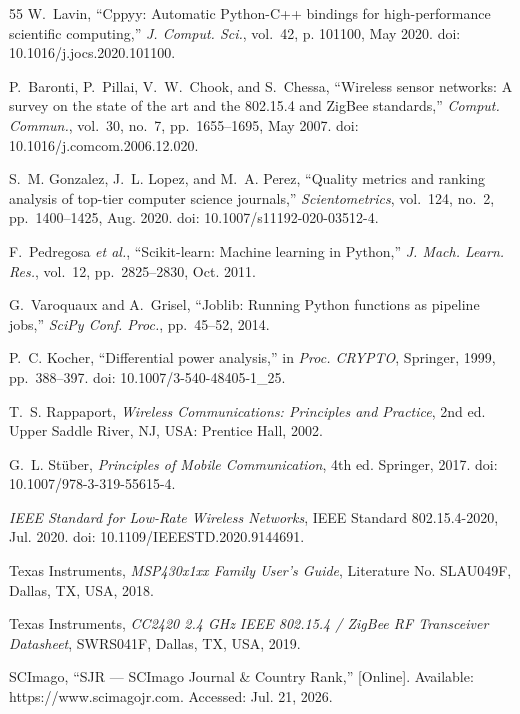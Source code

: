 \documentclass[journal]{IEEEtran}
\begin{document}
\begin{thebibliography}{55}
W.~Lavin, ``Cppyy: Automatic Python-C++ bindings for high-performance scientific computing,'' \textit{J. Comput. Sci.}, vol.~42, p. 101100, May 2020. doi: 10.1016/j.jocs.2020.101100.

P.~Baronti, P.~Pillai, V.~W.~Chook, and S.~Chessa, ``Wireless sensor networks: A survey on the state of the art and the 802.15.4 and ZigBee standards,'' \textit{Comput. Commun.}, vol.~30, no.~7, pp.~1655--1695, May 2007. doi: 10.1016/j.comcom.2006.12.020.

S.~M. Gonzalez, J.~L. Lopez, and M.~A. Perez, ``Quality metrics and ranking analysis of top-tier computer science journals,'' \textit{Scientometrics}, vol.~124, no.~2, pp.~1400--1425, Aug. 2020. doi: 10.1007/s11192-020-03512-4.

F.~Pedregosa \textit{et al.}, ``Scikit-learn: Machine learning in Python,'' \textit{J. Mach. Learn. Res.}, vol.~12, pp.~2825--2830, Oct. 2011.

G.~Varoquaux and A.~Grisel, ``Joblib: Running Python functions as pipeline jobs,'' \textit{SciPy Conf. Proc.}, pp.~45--52, 2014.

P.~C. Kocher, ``Differential power analysis,'' in \textit{Proc. CRYPTO}, Springer, 1999, pp.~388--397. doi: 10.1007/3-540-48405-1_25.

T.~S. Rappaport, \textit{Wireless Communications: Principles and Practice}, 2nd ed. Upper Saddle River, NJ, USA: Prentice Hall, 2002.

G.~L. Stüber, \textit{Principles of Mobile Communication}, 4th ed. Springer, 2017. doi: 10.1007/978-3-319-55615-4.

\textit{IEEE Standard for Low-Rate Wireless Networks}, IEEE Standard 802.15.4-2020, Jul. 2020. doi: 10.1109/IEEESTD.2020.9144691.

Texas Instruments, \textit{MSP430x1xx Family User's Guide}, Literature No. SLAU049F, Dallas, TX, USA, 2018.

Texas Instruments, \textit{CC2420 2.4 GHz IEEE 802.15.4 / ZigBee RF Transceiver Datasheet}, SWRS041F, Dallas, TX, USA, 2019.

SCImago, ``SJR --- SCImago Journal \& Country Rank,'' [Online]. Available: https://www.scimagojr.com. Accessed: Jul. 21, 2026.


\end{thebibliography}
\end{document}

